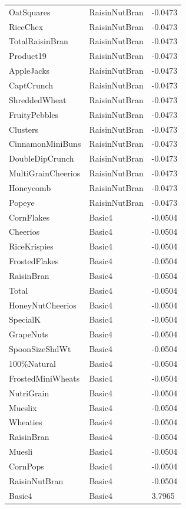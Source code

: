 \begin{table}[!htbp]
\begin{tabular}{lll}
\\
OatSquares & RaisinNutBran & -0.0473
\\
RiceChex & RaisinNutBran & -0.0473
\\
TotalRaisinBran & RaisinNutBran & -0.0473
\\
Product19 & RaisinNutBran & -0.0473
\\
AppleJacks & RaisinNutBran & -0.0473
\\
CaptCrunch & RaisinNutBran & -0.0473
\\
ShreddedWheat & RaisinNutBran & -0.0473
\\
FruityPebbles & RaisinNutBran & -0.0473
\\
Clusters & RaisinNutBran & -0.0473
\\
CinnamonMiniBuns & RaisinNutBran & -0.0473
\\
DoubleDipCrunch & RaisinNutBran & -0.0473
\\
MultiGrainCheerios & RaisinNutBran & -0.0473
\\
Honeycomb & RaisinNutBran & -0.0473
\\
Popeye & RaisinNutBran & -0.0473
\\
CornFlakes & Basic4 & -0.0504
\\
Cheerios & Basic4 & -0.0504
\\
RiceKrispies & Basic4 & -0.0504
\\
FrostedFlakes & Basic4 & -0.0504
\\
RaisinBran & Basic4 & -0.0504
\\
Total & Basic4 & -0.0504
\\
HoneyNutCheerios & Basic4 & -0.0504
\\
SpecialK & Basic4 & -0.0504
\\
GrapeNuts & Basic4 & -0.0504
\\
SpoonSizeShdWt & Basic4 & -0.0504
\\
100\%Natural & Basic4 & -0.0504
\\
FrostedMiniWheats & Basic4 & -0.0504
\\
NutriGrain & Basic4 & -0.0504
\\
Mueslix & Basic4 & -0.0504
\\
Wheaties & Basic4 & -0.0504
\\
RaisinBran & Basic4 & -0.0504
\\
Muesli & Basic4 & -0.0504
\\
CornPops & Basic4 & -0.0504
\\
RaisinNutBran & Basic4 & -0.0504
\\
Basic4 & Basic4 & 3.7965

\end{tabular}
\end{table}
